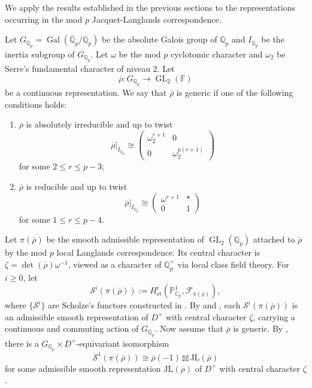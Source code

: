 \documentclass[11pt,a4paper]{article} %
\def\CC{\mathbb{C}}
\def\FF{\mathbb{F}}
\def\PP{\mathbb{P}}
\def\cF{\mathcal{F}}
\def\cS{\mathcal{S}}
\def\det{\operatorname{det}}
\def\Gal{\operatorname{Gal}}
\def\GL{\operatorname{GL}}
\def\Qp{\mathbb{Q}_p}
\def\Qpbar{\overline{\mathbb{Q}}_p}
\def\rhobar{\overline{\rho}}
\begin{document}
We apply the results established in the previous sections to the representations occurring in the mod $p$ Jacquet-Langlands correspondence. 

Let $G_{\Qp}=\Gal(\Qpbar/\Qp)$ be the absolute Galois group of $\Qp$ and $I_{\Qp}$ be the inertia subgroup of $G_{\Qp}$. Let $\omega$ be the mod $p$ cyclotomic character and $\omega_2$ be Serre's fundamental character of niveau $2$. Let
\[
\rhobar:G_{\Qp}\longrightarrow\GL_2(\FF)
\]
be a continuous representation. We say that $\rhobar$ is generic if one of the following conditions holds:
\begin{enumerate}[label=\alph*)]
    \item $\rhobar$ is absolutely irreducible and up to twist
    \[
    \rhobar|_{I_{\Qp}}\cong
    \begin{pmatrix}
    \omega_2^{r+1}&0\\
    0&\omega_2^{p(r+1)}
    \end{pmatrix}
    \]
    for some $2\le r\le p-3$;
    \item $\rhobar$ is reducible and up to twist
    \[
    \rhobar|_{I_{\Qp}}\cong
    \begin{pmatrix}
    \omega^{r+1}&*\\
    0&1
    \end{pmatrix}
    \]
    for some $1\le r\le p-4$.
\end{enumerate}

Let $\pi(\rhobar)$ be the smooth admissible representation of $\GL_2(\Qp)$ attached to $\rhobar$ by the mod $p$ local Langlands correspondence. Its central character is $\zeta=\det(\rhobar)\omega^{-1}$, viewed as a character of $\Qp^\times$ via local class field theory. For $i\ge0$, let
\[
\cS^i(\pi(\rhobar)):=H^i_{\mathrm{\acute et}}\left(\PP^1_{\CC_p},\cF_{\pi(\rhobar)}\right),
\]
where $\{\cS^i\}$ are Scholze's functors constructed in \cite{Sch18}. By \cite[Theorem 1.1]{Sch18} and \cite[Lemma 7.3]{DPS23}, each $\cS^i(\pi(\rhobar))$ is an admissible smooth representation of $D^\times$ with central character $\zeta$, carrying a continuous and commuting action of $G_{\Qp}$. Now assume that $\rhobar$ is generic. By \cite[Theorem 1.4]{HW24a}, there is a $G_{\Qp}\times D^\times$-equivariant isomorphism
\begin{equation}\label{eq:JL-isotypy}
\cS^1(\pi(\rhobar))\cong\rhobar(-1)\boxtimes\mathrm{JL}(\rhobar)
\end{equation}
for some admissible smooth representation $\mathrm{JL}(\rhobar)$ of $D^\times$ with central character $\zeta$.
\end{document}
